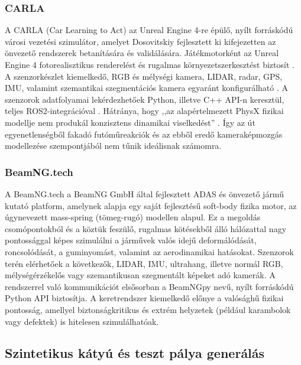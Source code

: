 \subsubsection{CARLA}

A CARLA (Car Learning to Act) az Unreal Engine 4-re épülő, nyílt forráskódú városi vezetési szimulátor, amelyet Dosovitskiy fejlesztett ki kifejezetten az önvezető rendszerek betanítására és validálására. Játékmotorként az Unreal Engine 4 fotorealisztikus renderelést és rugalmas környezetszerkesztést biztosít \cite{dosovitskiyCARLAOpenUrban2017}. A szenzorkészlet kiemelkedő, RGB és mélységi kamera, LIDAR, radar, GPS, IMU, valamint szemantikai szegmentációs kamera egyaránt konfigurálható \cite{SensorsReferenceCARLA}. A szenzorok adatfolyamai lekérdezhetőek Python, illetve C++ API-n keresztül, teljes ROS2-integrációval \cite{PythonAPICARLA, ReferenceCARLASimulator}. Hátránya, hogy ,,az alapértelmezett PhysX fizikai modellje nem produkál konzisztens dinamikai viselkedést'' \cite{jiIntegrationValidationTrucksim2026}. Így az út egyenetlenségből fakadó futóműreakciók és az ebből eredő kameraképmozgás modellezése szempontjából nem tűnik ideálisnak számomra.

\subsubsection{BeamNG.tech}

A BeamNG.tech a BeamNG GmbH által fejlesztett ADAS és önvezető jármű kutató platform, amelynek alapja egy saját fejlesztésű soft-body fizika motor, az úgynevezett mass-spring (tömeg-rugó) modellen alapul. Ez a megoldás csomópontokból és a köztük feszülő, rugalmas kötésekből álló hálózattal nagy pontossággal képes szimulálni a járművek valós idejű deformálódását, roncsolódását, a guminyomást, valamint az aerodinamikai hatásokat. Szenzorok terén elérhetőek a következők, LIDAR, IMU, ultrahang, illetve normál RGB, mélységérzékelős vagy szemantikusan szegmentált képeket adó kamerák. A rendszerrel való kommunikációt elsősorban a BeamNGpy nevű, nyílt forráskódú Python API biztosítja. A keretrendszer kiemelkedő előnye a valósághű fizikai pontosság, amellyel biztonságkritikus és extrém helyzetek (például karambolok vagy defektek) is hitelesen szimulálhatóak. \cite{gambiSoftbodySimulationProcedural} \cite{maulBeamNGtechTechnicalPaper}

\subsection{Szintetikus kátyú és teszt pálya generálás}

